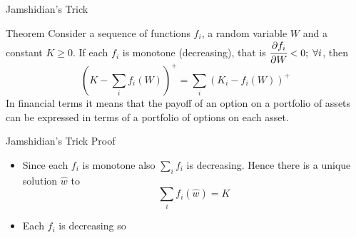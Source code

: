 \documentclass{beamer}
\begin{document}
\begin{frame}{Jamshidian's Trick}
\begin{block}{Theorem}
	Consider a sequence of functions $f_i$, a random variable $W$ and a constant $K\ge0$. If each $f_i$ is monotone (decreasing), that is $\cfrac{\partial f_i}{\partial W} < 0;\;\forall i$, then 
	\begin{equation*}
		\left(K - \sum_i f_i(W)\right)^+ = 	\sum_i \left(K_i - f_i(W)\right)^+
	\end{equation*} 
	In financial terms it means that the payoff of an option on a portfolio of assets can be expressed in terms of a portfolio of options on each asset.
\end{block}
\end{frame}

\begin{frame}{Jamshidian's Trick Proof}
\begin{itemize}
	\item<1-> Since each $f_i$ is monotone also $\sum_i f_i$ is decreasing. Hence there is a unique solution $\hat{w}$ to 
	\begin{equation*}
		\sum_i f_i(\hat{w}) = K
	\end{equation*}
	\item<2-> Each $f_i$ is decreasing so
	\begin{columns}
\end{columns}
\end{itemize}
\end{frame}
\end{document}

